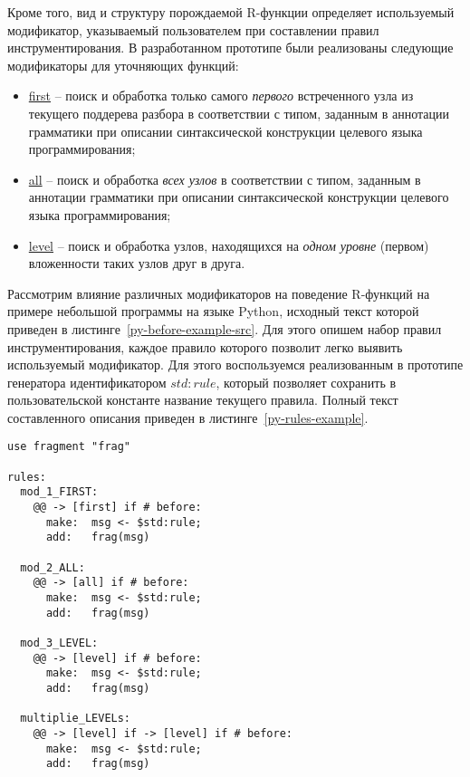 Кроме того, вид и структуру порождаемой R-функции определяет используемый модификатор, указываемый пользователем при составлении правил инструментирования.
В разработанном прототипе были реализованы следующие модификаторы для уточняющих функций:

\begin{itemize}[noitemsep]
  \item \underline{first} -- поиск и обработка только самого \textit{первого} встреченного узла из текущего поддерева разбора в соответствии с типом, заданным в аннотации грамматики при описании синтаксической конструкции целевого языка программирования;
  \item \underline{all}   -- поиск и обработка \textit{всех узлов} в соответствии с типом, заданным в аннотации грамматики при описании синтаксической конструкции целевого языка программирования;
  \item \underline{level} -- поиск и обработка узлов, находящихся на \textit{одном уровне} (первом) вложенности таких узлов друг в друга.
\end{itemize}

Рассмотрим влияние различных модификаторов на поведение R-функций на примере небольшой программы на языке Python, исходный текст которой приведен в листинге~\ref{py-before-example-src}.
Для этого опишем набор правил инструментирования, каждое правило которого позволит легко выявить используемый модификатор.
Для этого воспользуемся реализованным в прототипе генератора идентификатором $std:rule$, который позволяет сохранить в пользовательской константе название текущего правила.
Полный текст составленного описания приведен в листинге~\ref{py-rules-example}.

\begin{lstlisting}[frame=single, label={py-rules-example}, caption={Применение различных модификаторов уточняющих функций в описании правил (форматирование изменено для компактности).}]
use fragment "frag"

rules:
  mod_1_FIRST:
    @@ -> [first] if # before:
      make:  msg <- $std:rule;
      add:   frag(msg)

  mod_2_ALL:
    @@ -> [all] if # before:
      make:  msg <- $std:rule;
      add:   frag(msg)

  mod_3_LEVEL:
    @@ -> [level] if # before:
      make:  msg <- $std:rule;
      add:   frag(msg)

  multiplie_LEVELs:
    @@ -> [level] if -> [level] if # before:
      make:  msg <- $std:rule;
      add:   frag(msg)
\end{lstlisting}

